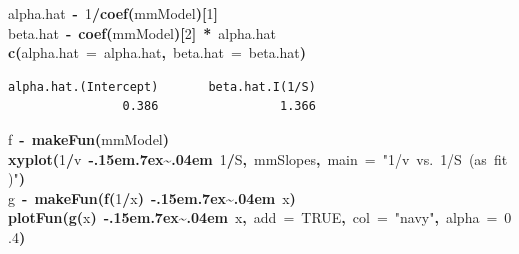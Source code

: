 \documentclass{article}
\makeatletter
\newcommand{\hlnumber}[1]{\textcolor[rgb]{0,0,0}{#1}}%
\newcommand{\hlfunctioncall}[1]{\textcolor[rgb]{0.501960784313725,0,0.329411764705882}{\textbf{#1}}}%
\newcommand{\hlstring}[1]{\textcolor[rgb]{0.6,0.6,1}{#1}}%
\newcommand{\hlkeyword}[1]{\textcolor[rgb]{0,0,0}{\textbf{#1}}}%
\newcommand{\hlargument}[1]{\textcolor[rgb]{0.690196078431373,0.250980392156863,0.0196078431372549}{#1}}%
\newcommand{\hlassignement}[1]{\textcolor[rgb]{0,0,0}{\textbf{#1}}}%
\newcommand{\hlsymbol}[1]{\textcolor[rgb]{0,0,0}{#1}}%
\def\urltilda{\kern -.15em\lower .7ex\hbox{\~{}}\kern .04em}%
\newcommand{\hlstd}[1]{\textcolor[rgb]{0,0,0}{#1}}%
\newenvironment{kframe}{%
 \def\FrameCommand##1{\hskip\@totalleftmargin \hskip-\fboxsep
 \colorbox{shadecolor}{##1}\hskip-\fboxsep
     \hskip-\linewidth \hskip-\@totalleftmargin \hskip\columnwidth}%
 \MakeFramed {\advance\hsize-\width
   \@totalleftmargin\z@ \linewidth\hsize
   \@setminipage}}%
 {\par\unskip\endMakeFramed}
\newenvironment{knitrout}{}{} %
\makeatother
\begin{document}
\begin{knitrout}
\begin{kframe}
\begin{verbatim}
\end{verbatim}
\begin{flushleft}
\ttfamily\noindent
\hlsymbol{alpha.hat}{\ }\hlassignement{\usebox{\hlnormalsizeboxlessthan}-}{\ }\hlnumber{1}\hlkeyword{/}\hlfunctioncall{coef}\hlkeyword{(}\hlsymbol{mmModel}\hlkeyword{)}\hlkeyword{[}\hlnumber{1}\hlkeyword{]}\hspace*{\fill}\\
\hlstd{}\hlsymbol{beta.hat}{\ }\hlassignement{\usebox{\hlnormalsizeboxlessthan}-}{\ }\hlfunctioncall{coef}\hlkeyword{(}\hlsymbol{mmModel}\hlkeyword{)}\hlkeyword{[}\hlnumber{2}\hlkeyword{]}{\ }\hlkeyword{*}{\ }\hlsymbol{alpha.hat}\hspace*{\fill}\\
\hlstd{}\hlfunctioncall{c}\hlkeyword{(}\hlargument{alpha.hat}{\ }\hlargument{=}{\ }\hlsymbol{alpha.hat}\hlkeyword{,}{\ }\hlargument{beta.hat}{\ }\hlargument{=}{\ }\hlsymbol{beta.hat}\hlkeyword{)}\mbox{}
\normalfont
\end{flushleft}
\begin{verbatim}
alpha.hat.(Intercept)       beta.hat.I(1/S) 
                0.386                 1.366 
\end{verbatim}
\begin{flushleft}
\ttfamily\noindent
\hlsymbol{f}{\ }\hlassignement{\usebox{\hlnormalsizeboxlessthan}-}{\ }\hlfunctioncall{makeFun}\hlkeyword{(}\hlsymbol{mmModel}\hlkeyword{)}\hspace*{\fill}\\
\hlstd{}\hlfunctioncall{xyplot}\hlkeyword{(}\hlnumber{1}\hlkeyword{/}\hlsymbol{v}{\ }\hlkeyword{\urltilda{}}{\ }\hlnumber{1}\hlkeyword{/}\hlsymbol{S}\hlkeyword{,}{\ }\hlsymbol{mmSlopes}\hlkeyword{,}{\ }\hlargument{main}{\ }\hlargument{=}{\ }\hlstring{"{}1/v{\ }vs.{\ }1/S{\ }(as{\ }fit)"{}}\hlkeyword{)}\hspace*{\fill}\\
\hlstd{}\hlsymbol{g}{\ }\hlassignement{\usebox{\hlnormalsizeboxlessthan}-}{\ }\hlfunctioncall{makeFun}\hlkeyword{(}\hlfunctioncall{f}\hlkeyword{(}\hlnumber{1}\hlkeyword{/}\hlsymbol{x}\hlkeyword{)}{\ }\hlkeyword{\urltilda{}}{\ }\hlsymbol{x}\hlkeyword{)}\hspace*{\fill}\\
\hlstd{}\hlfunctioncall{plotFun}\hlkeyword{(}\hlfunctioncall{g}\hlkeyword{(}\hlsymbol{x}\hlkeyword{)}{\ }\hlkeyword{\urltilda{}}{\ }\hlsymbol{x}\hlkeyword{,}{\ }\hlargument{add}{\ }\hlargument{=}{\ }\hlnumber{TRUE}\hlkeyword{,}{\ }\hlargument{col}{\ }\hlargument{=}{\ }\hlstring{"{}navy"{}}\hlkeyword{,}{\ }\hlargument{alpha}{\ }\hlargument{=}{\ }\hlnumber{0.4}\hlkeyword{)}\hspace*{\fill}\\

\end{flushleft}
\end{kframe}
\end{knitrout}
\end{document}
